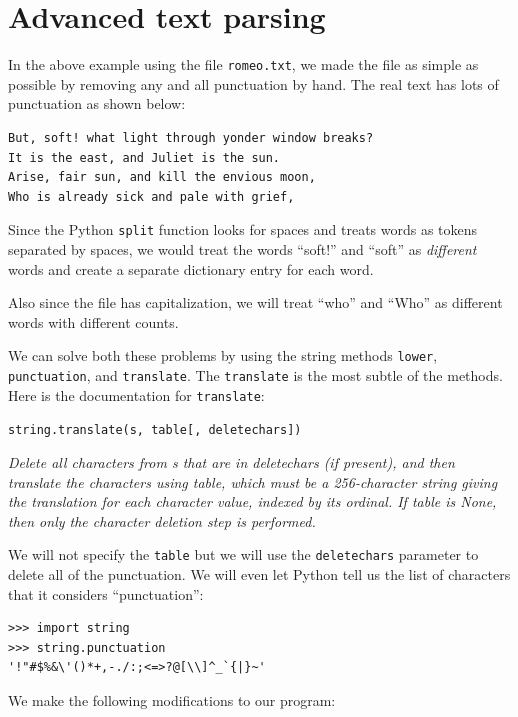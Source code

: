 \documentclass[10pt]{book}
\begin{document}
\section{Advanced text parsing}

In the above example using the file {\tt romeo.txt},
we made the file as simple as possible by removing 
any and all punctuation by hand.  The real text 
has lots of punctuation as shown below:

\beforeverb
\begin{verbatim}
But, soft! what light through yonder window breaks?
It is the east, and Juliet is the sun.
Arise, fair sun, and kill the envious moon,
Who is already sick and pale with grief,
\end{verbatim}
\afterverb
%
Since the Python {\tt split} function looks for spaces and
treats words as tokens separated by spaces, we would treat the
words ``soft!'' and ``soft'' as {\em different} words and create
a separate dictionary entry for each word.

Also since the file has capitalization, we will treat
``who'' and ``Who'' as different words with different 
counts.

We can solve both these problems by using the string
methods {\tt lower}, {\tt punctuation}, and {\tt translate}.  The 
{\tt translate} is the most subtle of the methods.  
Here is the documentation for {\tt translate}:

\verb"string.translate(s, table[, deletechars])"

{\em Delete all characters from s that are in deletechars (if present), 
and then translate the characters using table, which must 
be a 256-character string giving the translation for each 
character value, indexed by its ordinal. If table is None, 
then only the character deletion step is performed.}

We will not specify the {\tt table} but we will use 
the {\tt deletechars} parameter to delete all of the punctuation.
We will even let Python tell us the list of characters
that it considers ``punctuation'':

\beforeverb
\begin{verbatim}
>>> import string
>>> string.punctuation
'!"#$%&\'()*+,-./:;<=>?@[\\]^_`{|}~'
\end{verbatim}
\afterverb
%
We make the following modifications to our program:
\end{document}
